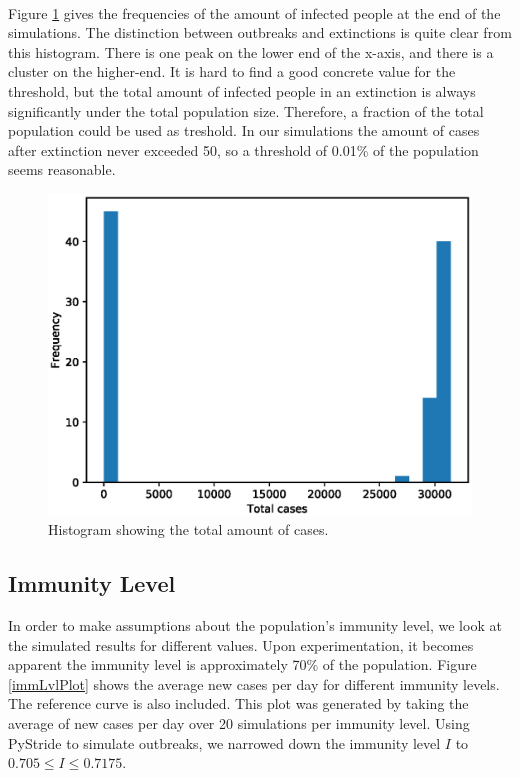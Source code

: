 \documentclass[runningheads]{llncs}
\begin{document}
\paragraph{}
Figure \ref{ETHist} gives the frequencies of the amount of infected people at the end of the simulations. The distinction between outbreaks and extinctions is quite clear from this histogram. There is one peak on the lower end of the x-axis, and there is a cluster on the higher-end. It is hard to find a good concrete value for the threshold, but the total amount of infected people in an extinction is always significantly under the total population size. Therefore, a fraction of the total population could be used as treshold. In our simulations the amount of cases after extinction never exceeded 50, so a threshold of 0.01\% of the population seems reasonable.

\begin{figure}[!h]
	\includegraphics[width=\textwidth]{Hist.eps}
	\caption{Histogram showing the total amount of cases.} 
	\label{ETHist}
\end{figure}

\subsection{Immunity Level}
In order to make assumptions about the population's immunity level, we look at the simulated results for different values. Upon experimentation, it becomes apparent the immunity level is approximately 70\% of the population. Figure \ref{immLvlPlot} shows the average new cases per day for different immunity levels. The reference curve is also included. This plot was generated by taking the average of new cases per day over 20 simulations per immunity level. Using PyStride to simulate outbreaks, we narrowed down the immunity level $I$ to \( 0.705 \leq I \leq 0.7175 \).
\end{document}
